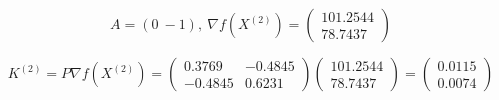 \begin{equation*}
	A = (0\ -1),\ 
	\nabla f(X^{(2)}) = \begin{pmatrix} 
		101.2544
		\\ 
		78.7437
	\end{pmatrix}
\end{equation*}

\begin{equation*}
	K^{(2)} = P \nabla f(X^{(2)}) = \begin{pmatrix} 
		0.3769 & -0.4845 
		\\ 
		-0.4845 & 0.6231 
	\end{pmatrix}
	\begin{pmatrix} 
		101.2544
		\\ 
		78.7437
	\end{pmatrix}
	=
	\begin{pmatrix} 
		0.0115
		\\ 
		0.0074
	\end{pmatrix}
\end{equation*}

